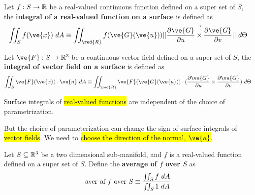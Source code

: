 \documentclass[11pt]{article}
\begin{document}
				\begin{definition}
					Let $f: S \to \mathbb{R}$ be a real-valued continuous function defined on a super set of $S$, the \textbf{integral of a real-valued function on a surface} is defined as
					\begin{equation}
						\iint_{S}f(\ve{x})\ dA 
						\equiv \iint_{\red{R}} f(\ve{G}(\ve{u}))\norm{\pd{\ve{G}}{u} \times \pd{\ve{G}}{v}}\ d\Theta
					\end{equation}
				\end{definition}
				
				\begin{definition}
					Let $\ve{F}: S \to \R^3$ be a continuous vector field defined on a super set of $S$, the \textbf{integral of vector field on a surface} is defined as
					\begin{equation}
						\iint_{S}\ve{F}(\ve{x}) \cdot \ve{n}\ dA
						\equiv \iint_{\red{R}} \ve{F}(\ve{G}(\ve{u}))\cdot (\pd{\ve{G}}{u} \times \pd{\ve{G}}{v})\ d\Theta
					\end{equation} 
				\end{definition}
				
				\begin{remark}
					Surface integrals of \hl{real-valued functions} are independent of the choice of parametrization.
				\end{remark}
				
				\begin{remark}
					But the choice of parameterization can change the sign of surface integrals of \hl{vector fields}. We need to \hl{choose the direction of the normal, $\ve{n}$}.
				\end{remark}
				
				\begin{definition}
					Let $S \subseteq \mathbb{R}^3$ be a two dimensional sub-manifold, and $f$ is a real-valued function defined on a super set of $S$. Define the \textbf{average of $f$ over $S$} as
					\begin{equation}
						\text{{aver of $f$ over $S$}} \equiv \frac{\iint_S f\ dA}{\iint_S1\ dA}
					\end{equation}
				\end{definition}
				
\end{document}
